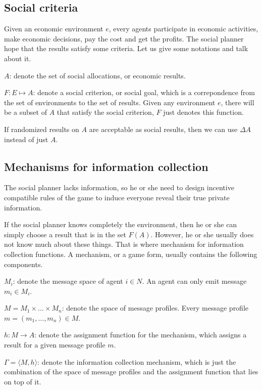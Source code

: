 \subsection{Social criteria}

Given an economic environment $e$, every agents participate in economic activities, make economic decisions, pay the cost and get the profits. The social planner hope that the results satisfy some criteria.
Let us give some notations and talk about it.

$A$: denote the set of social allocations, or economic results.

$F : E \mapsto A$: denote a social criterion, or social goal, which is a correpondence from the set of environments to the set of results. Given any environment $e$, there will be a subset of $A$ that satisfy the social criterion, $F$ just denotes this function.

If randomized results on $A$ are acceptable as social results, then we can use 
$\Delta A$ instead of just $A$. 

\subsection{Mechanisms for information collection}

 The social planner lacks information, so he or she need to design incentive
compatible rules of the game to induce everyone reveal their true private information. 

If the social planner knows completely the environment, then he or she
can simply choose a result that is in the set $F(A)$. However, he or
she usually does not know much about these things. That is where
mechanism for information collection functions.  A mechanism, or  a
game form, usually contains the following components.

$M_i$: denote the message space of agent $i \in N$. An agent can only emit 
message $m_i \in M_i$.

$M=M_1\times\dots\times M_n$: denote the space of message profiles. Every message profile $m=(m_1,\dots,m_n)\in M$.

$h:M\rightarrow A$: denote the assignment function for the mechanism, which assigns a result for a given message profile $m$.

$ \Gamma = \langle M,h\rangle$: denote the information collection mechanism, which is just the combination of the space of message profiles and the assignment function that lies on top of it.

